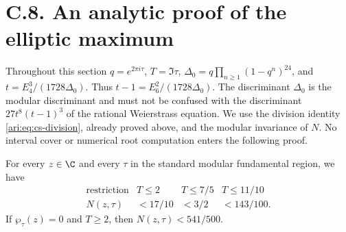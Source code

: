 \section{C.8. An analytic proof of the elliptic maximum}

Throughout this section $q=e^{2\pi i\tau}$, $T=\Im\tau$,
$\Delta_0=q\prod_{n\ge1}(1-q^n)^{24}$, and
$t=E_4^3/(1728\Delta_0)$. Thus $t-1=E_6^2/(1728\Delta_0)$.
The discriminant $\Delta_0$ is the modular discriminant and must not
be confused with the discriminant $27t^8(t-1)^3$ of the rational
Weierstrass equation. We use the division identity
\eqref{ari:eq:cs-division}, already proved above, and the modular
invariance of $N$. No interval cover or numerical root computation
enters the following proof.

\begin{proposition}\label{ari:C.8.1}
For every $z\in\C$ and every $\tau$ in the standard modular
fundamental region, we have
\[
 \begin{array}{c|ccc}
 \text{restriction}&T\le2&T\le7/5&T\le11/10\\ \hline
 N(z,\tau)&<17/10&<3/2&<143/100.
 \end{array}
\]
If $\wp_\tau(z)=0$ and $T\ge2$, then $N(z,\tau)<541/500$.
\end{proposition}
